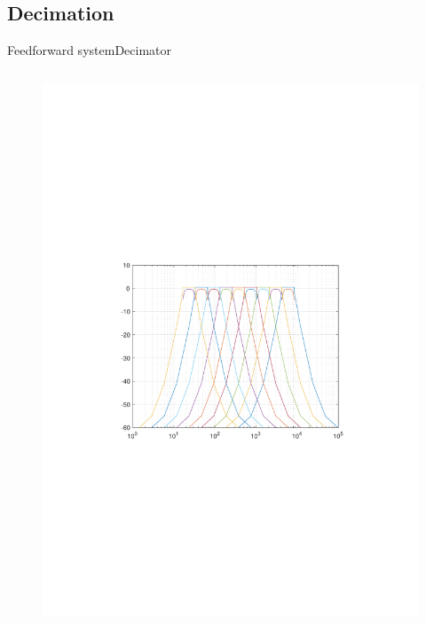 \documentclass[10pt,aspectratio=169]{beamer}
\begin{document}
\subsection{Decimation}
\begin{frame}{Feedforward system}{Decimator}

\begin{columns}
  \begin{column}{0.4\textwidth}
\begin{figure}
\centering
\includegraphics[width=\textwidth]{Bands}
\end{figure}
  \end{column}


\end{columns}
\end{frame}
\end{document}

